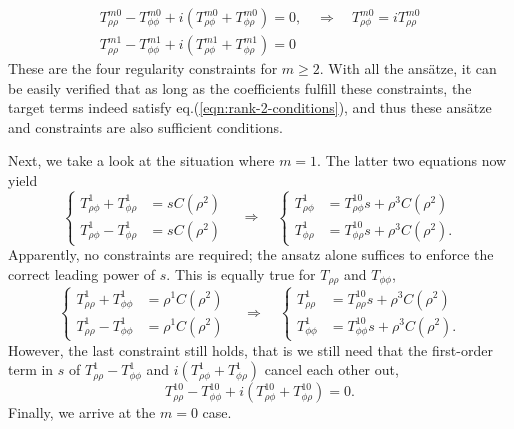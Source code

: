 \documentclass[a4paper, 11pt]{article}
\begin{document}
\[
\begin{aligned}
    T_{\rho\rho}^{m0} - T_{\phi\phi}^{m0} + i \left(T_{\rho\phi}^{m0} + T_{\phi\rho}^{m0}\right) = 0, \quad \Longrightarrow\quad T_{\rho\phi}^{m0} = i T_{\rho\rho}^{m0} \\
    T_{\rho\rho}^{m1} - T_{\phi\phi}^{m1} + i \left(T_{\rho\phi}^{m1} + T_{\phi\rho}^{m1}\right) = 0
\end{aligned}
\]
These are the four regularity constraints for $m\geq 2$. With all the ansätze, it can be easily verified that as long as the coefficients fulfill these constraints, the target terms indeed satisfy eq.(\ref{eqn:rank-2-conditions}), and thus these ansätze and constraints are also sufficient conditions.

Next, we take a look at the situation where $m=1$. The latter two equations now yield
\[
\left\{\begin{aligned}
    T_{\rho\phi}^1 + T_{\phi\rho}^1 &= s C(\rho^2) \\ 
    T_{\rho\phi}^1 - T_{\phi\rho}^1 &= s C(\rho^2)
\end{aligned}\right. \quad \Longrightarrow\quad 
\left\{\begin{aligned}
    T_{\rho\phi}^1 &= T_{\rho\phi}^{10} s + \rho^{3} C(\rho^2) \\ 
    T_{\phi\rho}^1 &= T_{\phi\rho}^{10} s + \rho^{3} C(\rho^2). 
\end{aligned}\right.
\]
Apparently, no constraints are required; the ansatz alone suffices to enforce the correct leading power of $s$. This is equally true for $T_{\rho\rho}$ and $T_{\phi\phi}$,
\[
\left\{\begin{aligned}
    T_{\rho\rho}^1 + T_{\phi \phi}^1 &= \rho^{1} C(\rho^2) \\ 
    T_{\rho\rho}^1 - T_{\phi \phi}^1 &= \rho^{1} C(\rho^2)
\end{aligned}\right. \quad \Longrightarrow\quad 
\left\{\begin{aligned}
    T_{\rho\rho}^1 &= T_{\rho\rho}^{10} s + \rho^{3} C(\rho^2) \\ 
    T_{\phi \phi}^1 &= T_{\phi\phi}^{10} s + \rho^{3} C(\rho^2) .
\end{aligned}\right.
\]
However, the last constraint still holds, that is we still need that the first-order term in $s$ of $T_{\rho\rho}^1 - T_{\phi\phi}^1$ and $i \left(T_{\rho\phi}^1 + T_{\phi\rho}^1\right)$ cancel each other out,
\[
    T_{\rho\rho}^{10} - T_{\phi\phi}^{10} + i \left(T_{\rho\phi}^{10} + T_{\phi\rho}^{10}\right) = 0.
\]
Finally, we arrive at the $m=0$ case.
\end{document}
